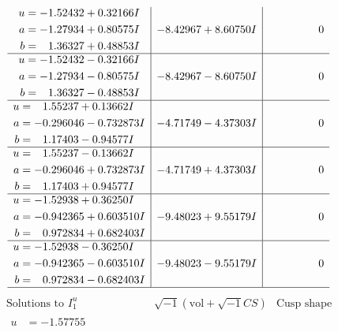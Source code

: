 \documentclass[1p]{elsarticle_modified}
\theoremstyle{definition}
\newcommand{\I}{\sqrt{-1}}
\begin{document}
$$\begin{array}{c|c|c}
\begin{aligned}
u &= -1.52432 + 0.32166 I \\
a &= -1.27934 + 0.80575 I \\
b &= \phantom{-}1.36327 + 0.48853 I\end{aligned}
 & -8.42967 + 8.60750 I & \phantom{-0.000000 } 0 \\ \hline\begin{aligned}
u &= -1.52432 - 0.32166 I \\
a &= -1.27934 - 0.80575 I \\
b &= \phantom{-}1.36327 - 0.48853 I\end{aligned}
 & -8.42967 - 8.60750 I & \phantom{-0.000000 } 0 \\ \hline\begin{aligned}
u &= \phantom{-}1.55237 + 0.13662 I \\
a &= -0.296046 - 0.732873 I \\
b &= \phantom{-}1.17403 - 0.94577 I\end{aligned}
 & -4.71749 - 4.37303 I & \phantom{-0.000000 } 0 \\ \hline\begin{aligned}
u &= \phantom{-}1.55237 - 0.13662 I \\
a &= -0.296046 + 0.732873 I \\
b &= \phantom{-}1.17403 + 0.94577 I\end{aligned}
 & -4.71749 + 4.37303 I & \phantom{-0.000000 } 0 \\ \hline\begin{aligned}
u &= -1.52938 + 0.36250 I \\
a &= -0.942365 + 0.603510 I \\
b &= \phantom{-}0.972834 + 0.682403 I\end{aligned}
 & -9.48023 + 9.55179 I & \phantom{-0.000000 } 0 \\ \hline\begin{aligned}
u &= -1.52938 - 0.36250 I \\
a &= -0.942365 - 0.603510 I \\
b &= \phantom{-}0.972834 - 0.682403 I\end{aligned}
 & -9.48023 - 9.55179 I & \phantom{-0.000000 } 0\\
 \hline 
 \end{array}$$\newpage$$\begin{array}{c|c|c}  
\text{Solutions to }I^u_{1}& \I (\text{vol} + \sqrt{-1}CS) & \text{Cusp shape}\\
 \hline 
\begin{aligned}
u &= -1.57755\phantom{ +0.000000I} \\

\end{aligned}
\end{array}$$
\end{document}
